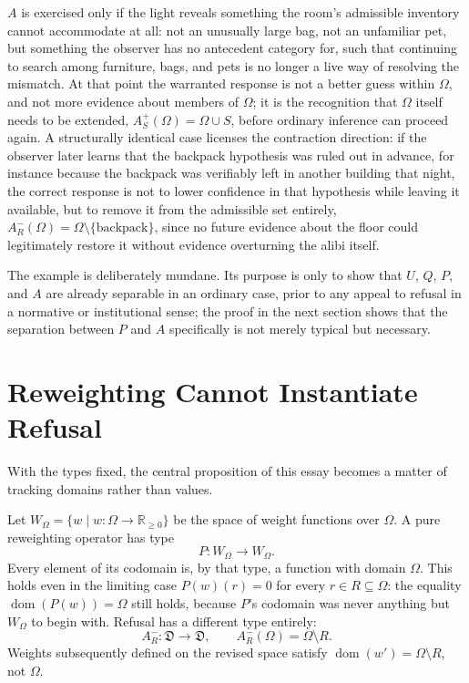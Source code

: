 \documentclass[11pt]{article}
\begin{document}
$A$ is exercised only if the light reveals something the room's admissible inventory cannot accommodate at all: not an unusually large bag, not an unfamiliar pet, but something the observer has no antecedent category for, such that continuing to search among furniture, bags, and pets is no longer a live way of resolving the mismatch. At that point the warranted response is not a better guess within $\Omega$, and not more evidence about members of $\Omega$; it is the recognition that $\Omega$ itself needs to be extended, $A_S^+(\Omega) = \Omega \cup S$, before ordinary inference can proceed again. A structurally identical case licenses the contraction direction: if the observer later learns that the backpack hypothesis was ruled out in advance, for instance because the backpack was verifiably left in another building that night, the correct response is not to lower confidence in that hypothesis while leaving it available, but to remove it from the admissible set entirely, $A_R^-(\Omega) = \Omega \setminus \{\text{backpack}\}$, since no future evidence about the floor could legitimately restore it without evidence overturning the alibi itself.

The example is deliberately mundane. Its purpose is only to show that $U$, $Q$, $P$, and $A$ are already separable in an ordinary case, prior to any appeal to refusal in a normative or institutional sense; the proof in the next section shows that the separation between $P$ and $A$ specifically is not merely typical but necessary.

\section{Reweighting Cannot Instantiate Refusal}

With the types fixed, the central proposition of this essay becomes a matter of tracking domains rather than values.

Let $W_\Omega = \{w \mid w : \Omega \rightarrow \mathbb{R}_{\geq 0}\}$ be the space of weight functions over $\Omega$. A pure reweighting operator has type
\[
P : W_\Omega \rightarrow W_\Omega.
\]
Every element of its codomain is, by that type, a function with domain $\Omega$. This holds even in the limiting case $P(w)(r) = 0$ for every $r \in R \subseteq \Omega$: the equality $\operatorname{dom}(P(w)) = \Omega$ still holds, because $P$'s codomain was never anything but $W_\Omega$ to begin with. Refusal has a different type entirely:
\[
A_R^- : \mathfrak{D} \rightarrow \mathfrak{D}, \qquad A_R^-(\Omega) = \Omega \setminus R.
\]
Weights subsequently defined on the revised space satisfy $\operatorname{dom}(w') = \Omega \setminus R$, not $\Omega$.
\end{document}
